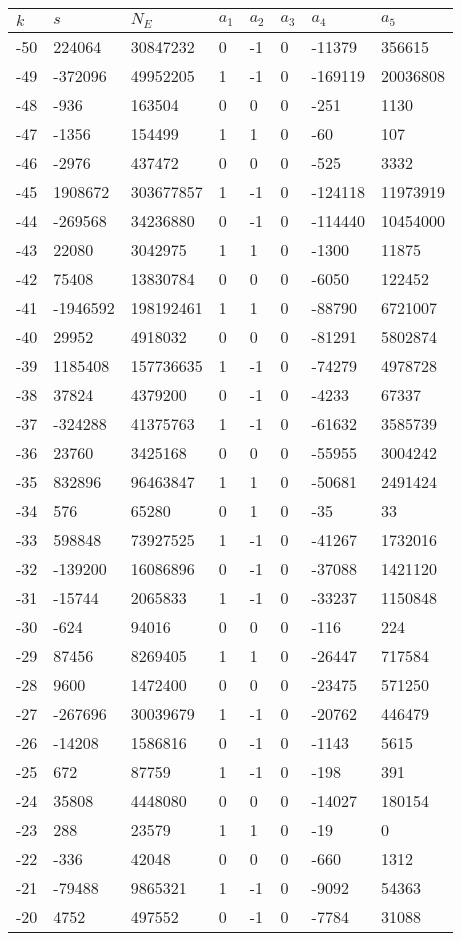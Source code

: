 \documentclass{amsart}
\begin{document}
\begin{longtable}{|l|l|l|lllll|}
\hline
$k$ & $s$ & $N_E$ & $a_1$ & $a_2$ & $a_3$ & $a_4$ & $a_5$\\
\hline
-50&224064&30847232&0&-1&0&-11379&356615\\
-49&-372096&49952205&1&-1&0&-169119&20036808\\
-48&-936&163504&0&0&0&-251&1130\\
-47&-1356&154499&1&1&0&-60&107\\
-46&-2976&437472&0&0&0&-525&3332\\
-45&1908672&303677857&1&-1&0&-124118&11973919\\
-44&-269568&34236880&0&-1&0&-114440&10454000\\
-43&22080&3042975&1&1&0&-1300&11875\\
-42&75408&13830784&0&0&0&-6050&122452\\
-41&-1946592&198192461&1&1&0&-88790&6721007\\
-40&29952&4918032&0&0&0&-81291&5802874\\
-39&1185408&157736635&1&-1&0&-74279&4978728\\
-38&37824&4379200&0&-1&0&-4233&67337\\
-37&-324288&41375763&1&-1&0&-61632&3585739\\
-36&23760&3425168&0&0&0&-55955&3004242\\
-35&832896&96463847&1&1&0&-50681&2491424\\
-34&576&65280&0&1&0&-35&33\\
-33&598848&73927525&1&-1&0&-41267&1732016\\
-32&-139200&16086896&0&-1&0&-37088&1421120\\
-31&-15744&2065833&1&-1&0&-33237&1150848\\
-30&-624&94016&0&0&0&-116&224\\
-29&87456&8269405&1&1&0&-26447&717584\\
-28&9600&1472400&0&0&0&-23475&571250\\
-27&-267696&30039679&1&-1&0&-20762&446479\\
-26&-14208&1586816&0&-1&0&-1143&5615\\
-25&672&87759&1&-1&0&-198&391\\
-24&35808&4448080&0&0&0&-14027&180154\\
-23&288&23579&1&1&0&-19&0\\
-22&-336&42048&0&0&0&-660&1312\\
-21&-79488&9865321&1&-1&0&-9092&54363\\
-20&4752&497552&0&-1&0&-7784&31088\\

\end{longtable}
\end{document}
